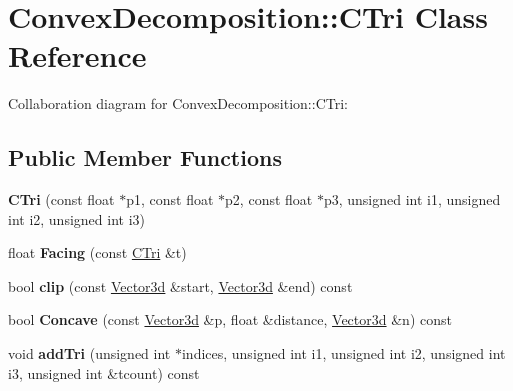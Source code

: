 \hypertarget{class_convex_decomposition_1_1_c_tri}{\section{Convex\+Decomposition\+:\+:C\+Tri Class Reference}
\label{class_convex_decomposition_1_1_c_tri}
}


Collaboration diagram for Convex\+Decomposition\+:\+:C\+Tri\+:
\subsection*{Public Member Functions}
\begin{DoxyCompactItemize}
\item 
\hypertarget{class_convex_decomposition_1_1_c_tri_a7770bb4d95e13f149ae67b4f8e7077fd}{{\bfseries C\+Tri} (const float $\ast$p1, const float $\ast$p2, const float $\ast$p3, unsigned int i1, unsigned int i2, unsigned int i3)}\label{class_convex_decomposition_1_1_c_tri_a7770bb4d95e13f149ae67b4f8e7077fd}

\item 
\hypertarget{class_convex_decomposition_1_1_c_tri_a486cc8c79cd957f5f58b20e2ccfa38ad}{float {\bfseries Facing} (const \hyperlink{class_convex_decomposition_1_1_c_tri}{C\+Tri} \&t)}\label{class_convex_decomposition_1_1_c_tri_a486cc8c79cd957f5f58b20e2ccfa38ad}

\item 
\hypertarget{class_convex_decomposition_1_1_c_tri_af0c2bbc8fcfe77f8afad928f7b3eaa3a}{bool {\bfseries clip} (const \hyperlink{class_convex_decomposition_1_1_vector3d}{Vector3d} \&start, \hyperlink{class_convex_decomposition_1_1_vector3d}{Vector3d} \&end) const }\label{class_convex_decomposition_1_1_c_tri_af0c2bbc8fcfe77f8afad928f7b3eaa3a}

\item 
\hypertarget{class_convex_decomposition_1_1_c_tri_a42bd6514a628378f97885b8d82733a3a}{bool {\bfseries Concave} (const \hyperlink{class_convex_decomposition_1_1_vector3d}{Vector3d} \&p, float \&distance, \hyperlink{class_convex_decomposition_1_1_vector3d}{Vector3d} \&n) const }\label{class_convex_decomposition_1_1_c_tri_a42bd6514a628378f97885b8d82733a3a}

\item 
\hypertarget{class_convex_decomposition_1_1_c_tri_a1d55a83c1087e3bbd7c029285df29a2e}{void {\bfseries add\+Tri} (unsigned int $\ast$indices, unsigned int i1, unsigned int i2, unsigned int i3, unsigned int \&tcount) const }\label{class_convex_decomposition_1_1_c_tri_a1d55a83c1087e3bbd7c029285df29a2e}


\end{DoxyCompactItemize}
